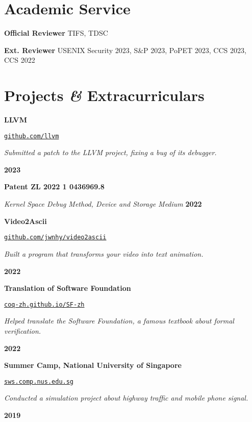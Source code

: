 \documentclass{resume}
\begin{document}
\section{Academic Service}
\begin{content}
  {\bf Official Reviewer} \enspace TIFS, TDSC

		{\bf Ext. Reviewer} \enspace USENIX Security 2023, S\&P 2023, PoPET 2023, CCS 2023, CCS 2022
\end{content}

\section{Projects \textbf{\em\&} Extracurriculars}

\begin{content}
	{\bf LLVM} \enspace
	{\href{https://github.com/llvm/}{\texttt{github.com/llvm}}

		{\em Submitted a patch to the LLVM project, fixing a bug of its debugger.} }
	\hfill {\bf 2023}

	{\bf Patent ZL 2022 1 0436969.8}

	{\em Kernel Space Debug Method, Device and Storage Medium}
	\hfill {\bf 2022}

	{\bf Video2Ascii} \enspace
	{\href{https://github.com/jwnhy/video2ascii}{\texttt{github.com/jwnhy/video2ascii}}

		{\em Built a program that transforms your video into text animation.} }
	\hfill {\bf 2022}

	{\bf Translation of Software Foundation} \enspace
	{\href{https://coq-zh.github.io/SF-zh/}{\texttt{coq-zh.github.io/SF-zh}}

		{\em Helped translate the Software Foundation, a famous textbook
			about formal verification.}}
	\hfill {\bf 2022}

	{\bf Summer Camp, National University of Singapore} \enspace
	{\href{https://sws.comp.nus.edu.sg/}{\texttt{sws.comp.nus.edu.sg}}

		{\em Conducted a simulation project about highway traffic and mobile phone
			signal.}}
	\hfill {\bf 2019}



	\sectionlineskip
\end{content}
\end{document}
